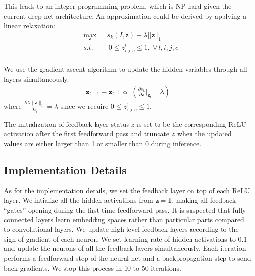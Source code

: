 This leads to an integer programming problem, which is NP-hard given the current deep net architecture. An approximation could be derived by applying a linear relaxation:
\begin{equation}
\begin{aligned}
& \max_\mathbf{z} & & s_k(I, \mathbf{z}) - \lambda ||\mathbf{z}||_1 \\
& s.t. & & \ 0 \leq z^l_{i,j,c} \leq 1, \; \forall\ l, i, j, c\\
\end{aligned}
\end{equation}

We use the gradient ascent algorithm to update the hidden variables through all layers simultaneously.
\begin{equation}
\begin{aligned}
\mathbf{z}_{t+1} = \mathbf{z}_t + \alpha \cdot (\frac{\partial s_k}{\partial \mathbf{z}} |_{\mathbf{z}_t} - \lambda)
\end{aligned}
\end{equation}
where $\frac{\partial \lambda \|\mathbf{z}\|_1}{\partial z_i} = \lambda$ since we require $0 \leq z^l_{i,j,c} \leq 1$.

The initialization of feedback layer status $z$ is set to be the corresponding ReLU activation after the first feedforward pass and truncate $z$ when the updated values are either larger than 1 or smaller than 0 during inference.

\subsection{Implementation Details}
As for the implementation details, we set the feedback layer on top of each ReLU layer. We intialize all the hidden activations from $\mathbf{z}=\mathbf{1}$, making all feedback ``gates'' opening during the first time feedforward pass. It is suspected that fully connected layers learn embedding spaces rather than particular parts compared to convolutional layers. We update high level feedback layers according to the sign of gradient of each neuron. We set learning rate of hidden activations to 0.1 and update the neurons of all the feedback layers simultaneously. Each iteration performs a feedforward step of the neural net and a backpropagation step to send back gradients. We stop this process in 10 to 50 iterations.

